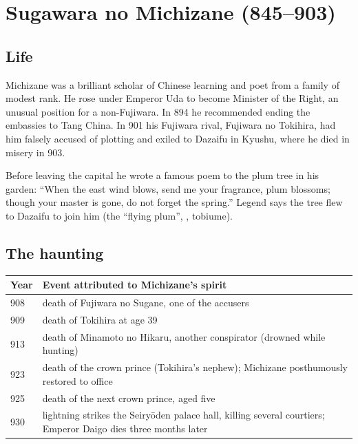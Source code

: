\section{Sugawara no Michizane (845--903)}

\subsection{Life}

Michizane was a brilliant scholar of Chinese learning and poet from a family of modest
rank. He rose under Emperor Uda to become Minister of the Right, an unusual position for a
non-Fujiwara. In 894 he recommended ending the embassies to Tang China. In 901 his Fujiwara
rival, Fujiwara no Tokihira, had him falsely accused of plotting and exiled to Dazaifu in
Kyushu, where he died in misery in 903.

\begin{aside}
Before leaving the capital he wrote a famous poem to the plum tree in his garden: ``When
the east wind blows, send me your fragrance, plum blossoms; though your master is gone, do
not forget the spring.'' Legend says the tree flew to Dazaifu to join him (the
``flying plum'', , tobiume).
\end{aside}

\subsection{The haunting}

\begin{center}
\begin{tabular}{lp{10.5cm}}
\toprule
Year & Event attributed to Michizane's spirit \\
\midrule
908 & death of Fujiwara no Sugane, one of the accusers \\
909 & death of Tokihira at age 39 \\
913 & death of Minamoto no Hikaru, another conspirator (drowned while hunting) \\
923 & death of the crown prince (Tokihira's nephew); Michizane posthumously restored to office \\
925 & death of the next crown prince, aged five \\
930 & lightning strikes the Seiryōden palace hall, killing several courtiers; Emperor Daigo dies three months later \\
\bottomrule
\end{tabular}
\end{center}

